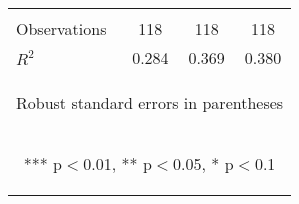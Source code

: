 \begin{center}
\begin{tabular}{lccc}
\vspace{4pt} & \begin{footnotesize}\end{footnotesize} & \begin{footnotesize}\end{footnotesize} & \begin{footnotesize}\end{footnotesize} \\
Observations & 118 & 118 & 118 \\
 $R^2$ & 0.284 & 0.369 & 0.380 \\ \hline
\multicolumn{4}{c}{\begin{footnotesize} Robust standard errors in parentheses\end{footnotesize}} \\
\multicolumn{4}{c}{\begin{footnotesize} *** p$<$0.01, ** p$<$0.05, * p$<$0.1\end{footnotesize}} \\
\end{tabular}
\end{center}
